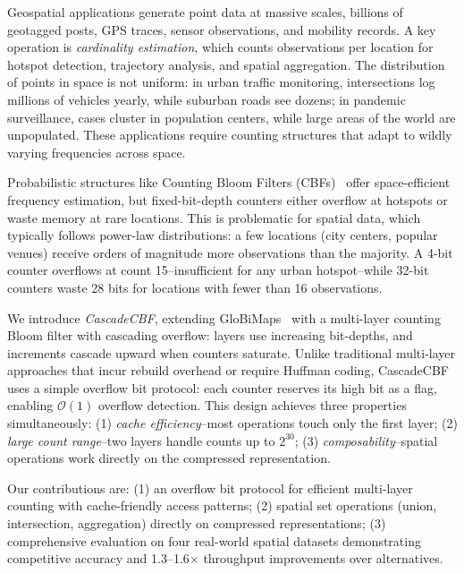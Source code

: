 \documentclass[agile, final]{copernicus-agile}
\begin{document}
Geospatial applications generate point data at massive scales, billions of geotagged posts, GPS traces, sensor observations, and mobility records. A key operation is \emph{cardinality estimation}, which counts observations per location for hotspot detection, trajectory analysis, and spatial aggregation. The distribution of points in space is not uniform: in urban traffic monitoring, intersections log millions of vehicles yearly, while suburban roads see dozens; in pandemic surveillance, cases cluster in population centers, while large areas of the world are unpopulated. These applications require counting structures that adapt to wildly varying frequencies across space.

Probabilistic structures like Counting Bloom Filters (CBFs)~\citep{fan2000summary} offer space-efficient frequency estimation, but fixed-bit-depth counters either overflow at hotspots or waste memory at rare locations. This is problematic for spatial data, which typically follows power-law distributions: a few locations (city centers, popular venues) receive orders of magnitude more observations than the majority. A 4-bit counter overflows at count 15--insufficient for any urban hotspot--while 32-bit counters waste 28 bits for locations with fewer than 16 observations.

We introduce \emph{CascadeCBF}, extending GloBiMaps~\citep{werner2019globimaps} with a multi-layer counting Bloom filter with cascading overflow: layers use increasing bit-depths, and increments cascade upward when counters saturate. Unlike traditional multi-layer approaches that incur rebuild overhead or require Huffman coding, CascadeCBF uses a simple overflow bit protocol: each counter reserves its high bit as a flag, enabling $\mathcal{O}(1)$ overflow detection. This design achieves three properties simultaneously: (1) \emph{cache efficiency}--most operations touch only the first layer; (2) \emph{large count range}--two layers handle counts up to $2^{30}$; (3) \emph{composability}--spatial operations work directly on the compressed representation.

Our contributions are: (1) an overflow bit protocol for efficient multi-layer counting with cache-friendly access patterns; (2) spatial set operations (union, intersection, aggregation) directly on compressed representations; (3) comprehensive evaluation on four real-world spatial datasets demonstrating competitive accuracy and 1.3--1.6$\times$ throughput improvements over alternatives.


\end{document}
